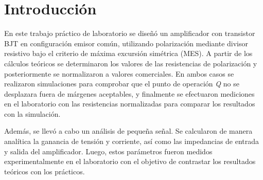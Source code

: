 \chapter{Introducción}

En este trabajo práctico de laboratorio se diseñó un amplificador con transistor BJT en configuración emisor común, utilizando
polarización mediante divisor resistivo bajo el criterio de máxima excursión simétrica (MES). A partir de los cálculos teóricos
se determinaron los valores de las resistencias de polarización y posteriormente se normalizaron a valores comerciales. En ambos
casos se realizaron simulaciones para comprobar que el punto de operación \emph{Q} no se desplazara fuera
de márgenes aceptables, y finalmente se efectuaron mediciones en el laboratorio con las resistencias normalizadas para comparar
los resultados con la simulación.

Además, se llevó a cabo un análisis de pequeña señal. Se calcularon de manera analítica la ganancia de tensión y corriente, así
como las impedancias de entrada y salida del amplificador. Luego, estos parámetros fueron medidos experimentalmente en el laboratorio
con el objetivo de contrastar los resultados teóricos con los prácticos.
